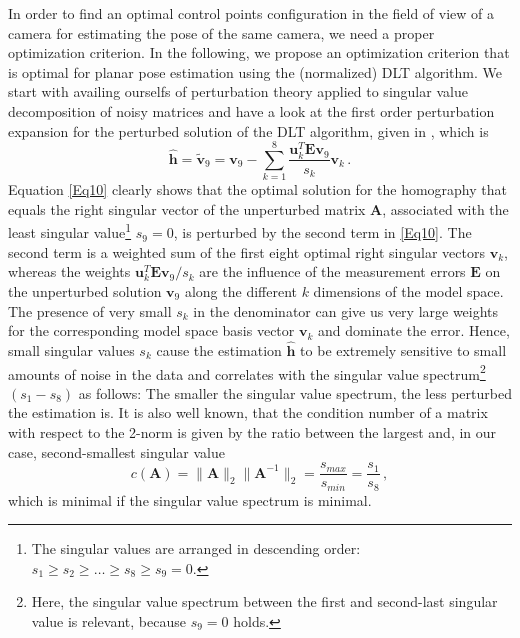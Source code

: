 \documentclass[letterpaper, 10 pt, conference]{ieeeconf}  %
\begin{document}
	In order to find an optimal control points configuration in the field of view of a camera for estimating the pose of the same camera, we need a proper optimization criterion. 
	In the following, we propose an optimization criterion that is optimal for planar pose estimation using the (normalized) DLT algorithm.
	We start with availing ourselfs of perturbation theory applied to singular value decomposition of noisy matrices \cite{Stewart1998} and have a look at the first order perturbation expansion for the
	perturbed solution of the DLT algorithm, given in \cite{Chen2009}, which is 
	\begin{equation}
	\label{Eq10}
	\hat{\mathbf{h}}=\tilde{\mathbf{v}}_9 = \mathbf{v}_9 - \sum\limits_{k=1}^8 \frac{\mathbf{u}_k^T\mathbf{E}\mathbf{v}_9}{s_k} \mathbf{v}_k\,.
	\end{equation}
	Equation \eqref{Eq10} clearly shows that the optimal solution for the homography that equals the 
	right singular vector of the unperturbed matrix $\mathbf{A}$, associated with the least singular value\footnote{The singular values are arranged in descending order: $s_1 \geq s_2 \geq \dots \geq s_8 \geq s_9 = 0$.}
	$s_9 = 0$, is perturbed by the second term in \eqref{Eq10}. The second term is a weighted sum of the first eight optimal right singular vectors $\mathbf{v}_k$, whereas the weights $\mathbf{u}_k^T\mathbf{E}\mathbf{v}_9/ s_k$ are the influence of the measurement errors $\mathbf{E}$
	on the unperturbed solution $\mathbf{v}_9$ along the different $k$ dimensions of the model space.
	The presence of very small $s_k$ in the denominator can give us very large weights for the corresponding model space basis vector $\mathbf{v}_k$ and dominate the error. Hence, small singular values $s_k$ cause the estimation $\hat{\mathbf{h}}$ to be extremely sensitive to small amounts of noise in the data and correlates with the singular value spectrum\footnote{Here, the singular value spectrum between the first and second-last singular value is relevant, because $s_9=0$ holds.} $(s_1-s_8)$ as follows: The smaller the singular value spectrum, the less perturbed the estimation is. It is also well known, that the condition number of a matrix  with respect to the 2-norm is given by the ratio between the largest and, in our case, second-smallest singular value \cite{Golub2013}
	\begin{equation}
	\label{Eqc}
	c(\mathbf{A}) = \| \mathbf{A} \|_2\| \mathbf{A}^{-1} \|_2 = \frac{s_{max}}{s_{min}}= \frac{s_1}{s_8}\,,
	\end{equation}    
	which is minimal if the singular value spectrum is minimal.
\end{document}
